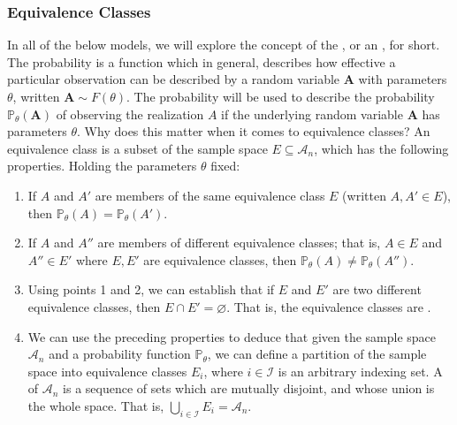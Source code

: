 \documentclass[letterpaper,10pt,english]{jupyterBook}
\begin{document}
\subsubsection{Equivalence Classes}
\label{\detokenize{representations/ch5/single-network-models_theory:equivalence-classes}}
\sphinxAtStartPar
In all of the below models, we will explore the concept of the , or an , for short. The probability is a function which in general, describes how effective a particular observation can be described by a random variable \(\mathbf A\) with parameters \(\theta\), written \(\mathbf A \sim F(\theta)\). The probability will be used to describe the probability \(\mathbb P_\theta(\mathbf A)\) of observing the realization \(A\) if the underlying random variable \(\mathbf A\) has parameters \(\theta\).  Why does this matter when it comes to equivalence classes? An equivalence class is a subset of the sample space \(E \subseteq \mathcal A_n\), which has the following properties. Holding the parameters \(\theta\) fixed:
\begin{enumerate}
%
\item {} 
\sphinxAtStartPar
If \(A\) and \(A'\) are members of the same equivalence class \(E\) (written \(A, A' \in E\)), then \(\mathbb P_\theta(A) = \mathbb P_\theta(A')\).

\item {} 
\sphinxAtStartPar
If \(A\) and \(A''\) are members of different equivalence classes; that is, \(A \in E\) and \(A'' \in E'\) where \(E, E'\) are equivalence classes, then \(\mathbb P_\theta(A) \neq \mathbb P_\theta(A'')\).

\item {} 
\sphinxAtStartPar
Using points 1 and 2, we can establish that if \(E\) and \(E'\) are two different equivalence classes, then \(E \cap E' = \varnothing\). That is, the equivalence classes are .

\item {} 
\sphinxAtStartPar
We can use the preceding properties to deduce that given the sample space \(\mathcal A_n\) and a probability function \(\mathbb P_\theta\), we can define a partition of the sample space into equivalence classes \(E_i\), where \(i \in \mathcal I\) is an arbitrary indexing set. A  of \(\mathcal A_n\) is a sequence of sets which are mutually disjoint, and whose union is the whole space. That is, \(\bigcup_{i \in \mathcal I} E_i = \mathcal A_n\).

\end{enumerate}
\end{document}
